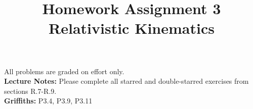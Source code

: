 \documentclass[12pt]{article}
\begin{document}
\date{\vspace{-5ex}}

\title{Homework Assignment 3 \\ Relativistic Kinematics}

\maketitle

\noindent
All problems are graded on effort only.\\

\noindent
{\bf Lecture Notes:}  Please complete all starred and double-starred exercises from sections R.7-R.9.\\

\noindent
{\bf Griffiths:} P3.4, P3.9, P3.11 \\[3pt]
\end{document}
